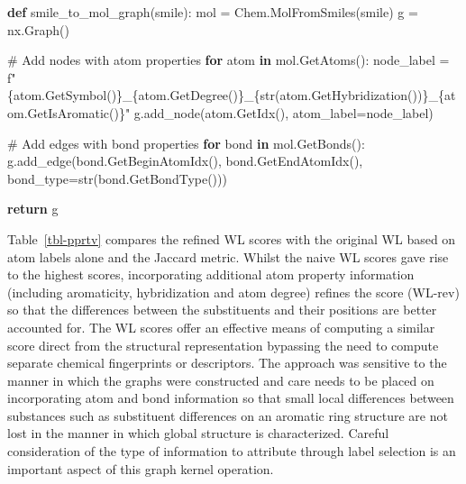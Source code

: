 \documentclass[
  super,
  preprint,
  3p]{elsarticle}
\newenvironment{Shaded}{\begin{snugshade}}{\end{snugshade}}
\newcommand{\BuiltInTok}[1]{\textcolor[rgb]{0.00,0.23,0.31}{#1}}
\newcommand{\CommentTok}[1]{\textcolor[rgb]{0.37,0.37,0.37}{#1}}
\newcommand{\ControlFlowTok}[1]{\textcolor[rgb]{0.00,0.23,0.31}{\textbf{#1}}}
\newcommand{\KeywordTok}[1]{\textcolor[rgb]{0.00,0.23,0.31}{\textbf{#1}}}
\newcommand{\NormalTok}[1]{\textcolor[rgb]{0.00,0.23,0.31}{#1}}
\newcommand{\OperatorTok}[1]{\textcolor[rgb]{0.37,0.37,0.37}{#1}}
\newcommand{\SpecialCharTok}[1]{\textcolor[rgb]{0.37,0.37,0.37}{#1}}
\newcommand{\SpecialStringTok}[1]{\textcolor[rgb]{0.13,0.47,0.30}{#1}}
\begin{document}
\begin{Shaded}
\begin{Highlighting}[]
\KeywordTok{def}\NormalTok{ smile\_to\_mol\_graph(smile):}
\NormalTok{    mol }\OperatorTok{=}\NormalTok{ Chem.MolFromSmiles(smile)}
\NormalTok{    g }\OperatorTok{=}\NormalTok{ nx.Graph()}
    
    \CommentTok{\# Add nodes with atom properties}
    \ControlFlowTok{for}\NormalTok{ atom }\KeywordTok{in}\NormalTok{ mol.GetAtoms():}
\NormalTok{        node\_label }\OperatorTok{=} \SpecialStringTok{f"}\SpecialCharTok{\{}\NormalTok{atom}\SpecialCharTok{.}\NormalTok{GetSymbol()}\SpecialCharTok{\}}\SpecialStringTok{\_}\SpecialCharTok{\{}\NormalTok{atom}\SpecialCharTok{.}\NormalTok{GetDegree()}\SpecialCharTok{\}}\SpecialStringTok{\_}\SpecialCharTok{\{}\BuiltInTok{str}\NormalTok{(atom.GetHybridization())}\SpecialCharTok{\}}\SpecialStringTok{\_}\SpecialCharTok{\{}\NormalTok{atom}\SpecialCharTok{.}\NormalTok{GetIsAromatic()}\SpecialCharTok{\}}\SpecialStringTok{"}
\NormalTok{        g.add\_node(atom.GetIdx(), }
\NormalTok{                   atom\_label}\OperatorTok{=}\NormalTok{node\_label)}

    \CommentTok{\# Add edges with bond properties}
    \ControlFlowTok{for}\NormalTok{ bond }\KeywordTok{in}\NormalTok{ mol.GetBonds():}
\NormalTok{        g.add\_edge(bond.GetBeginAtomIdx(), }
\NormalTok{                   bond.GetEndAtomIdx(), }
\NormalTok{                   bond\_type}\OperatorTok{=}\BuiltInTok{str}\NormalTok{(bond.GetBondType()))}

    \ControlFlowTok{return}\NormalTok{ g}
\end{Highlighting}
\end{Shaded}

Table~\ref{tbl-pprtv} compares the refined WL scores with the original
WL based on atom labels alone and the Jaccard metric. Whilst the naive
WL scores gave rise to the highest scores, incorporating additional atom
property information (including aromaticity, hybridization and atom
degree) refines the score (WL-rev) so that the differences between the
substituents and their positions are better accounted for. The WL scores
offer an effective means of computing a similar score direct from the
structural representation bypassing the need to compute separate
chemical fingerprints or descriptors. The approach was sensitive to the
manner in which the graphs were constructed and care needs to be placed
on incorporating atom and bond information so that small local
differences between substances such as substituent differences on an
aromatic ring structure are not lost in the manner in which global
structure is characterized. Careful consideration of the type of
information to attribute through label selection is an important aspect
of this graph kernel operation.
\end{document}
